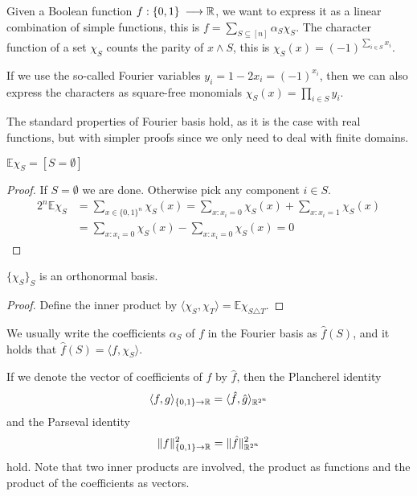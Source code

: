 \documentclass[a4paper,twoside,justified]{tufte-handout}
\begin{document}
Given a Boolean function $f:\{0,1\}\:\longrightarrow \mathbb{R}$, we want to express it as a linear combination of simple functions, this is $f = \sum_{S \subseteq [n]} \alpha_S \chi_S$. The character function of a set $\chi_S$ counts the parity of $x \land S$, this is $\chi_S(x) = (-1)^{\sum_{i\in S} x_i}$.

If we use the so-called Fourier variables $y_i = 1-2x_i = (-1)^{x_i}$, then we can also express the characters as square-free monomials $\chi_S(x) = \prod_{i\in S} y_i$.

The standard properties of Fourier basis hold, as it is the case with real functions, but with simpler proofs since we only need to deal with finite domains.

\begin{lemma}
  $\mathbb{E} \chi_S = [S=\emptyset]$
\end{lemma}
\begin{proof}
  If $S=\emptyset$ we are done. Otherwise pick any component $i\in S$.
\begin{align}
2^n \mathbb{E} \chi_S &=
\sum_{x \in \{0,1\}^n} \chi_S(x) = 
\sum_{x : x_i = 0} \chi_S(x) + \sum_{x : x_i = 1} \chi_S(x) \\ &= 
\sum_{x : x_i = 0} \chi_S(x) - \sum_{x : x_i = 0} \chi_S(x) = 0
\end{align}
\end{proof}

\begin{lemma}
  $\{\chi_S\}_S$ is an orthonormal basis.
\end{lemma}
\begin{proof}
  Define the inner product by $\langle \chi_S, \chi_T \rangle = \mathbb{E}\chi_{S \triangle T}$.
\end{proof}

We usually write the coefficients $\alpha_S$ of $f$ in the Fourier basis as $\hat{f}(S)$, and it holds that $\hat{f}(S) = \langle f,\chi_S \rangle$.

If we denote the vector of coefficients of $f$ by $\hat f$, then the Plancherel identity
\begin{equation}\langle f,g \rangle_{\{0,1\}\to\mathbb{R}} = \langle \hat f, \hat g \rangle_{\mathbb{R}^{2^n}}\end{equation}
and the Parseval identity 
\begin{equation}
\|f\|_{\{0,1\}\to\mathbb{R}}^2=\|\hat f\|_{\mathbb{R}^{2^n}}^2
\end{equation}
hold. Note that two inner products are involved, the product as functions and the product of the coefficients as vectors.

%


\end{document}
